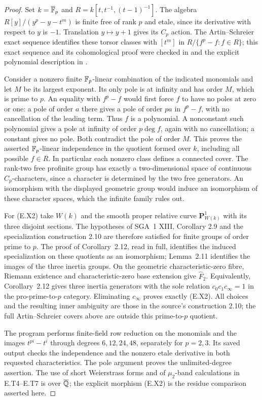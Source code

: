 \begin{proof}
Set $k=\overline{\mathbb F}_p$ and
$R=k[t,t^{-1},(t-1)^{-1}]$.
The algebra $R[y]/(y^p-y-t^m)$ is finite free of rank
$p$ and etale, since its derivative with respect to
$y$ is $-1$.  Translation $y\mapsto y+1$ gives its
$C_p$ action.  The Artin--Schreier exact sequence
identifies these torsor classes with $[t^m]$ in
$R/\{f^p-f:f\in R\}$; this exact sequence and its
cohomological proof were checked in
\cite[Tag 0A3J]{StacksArtinSchreier} and the explicit
polynomial description in
\cite[XIII, p.~292]{SGA1Revised}.

Consider a nonzero finite $\mathbb F_p$-linear combination of
the indicated monomials and let $M$ be its largest
exponent.  Its only pole is at infinity and has order
$M$, which is prime to $p$.  An equality with $f^p-f$
would first force $f$ to have no poles at zero or one:
a pole of order $a$ there gives a pole of order $pa$
in $f^p-f$, with no cancellation of the leading term.
Thus $f$ is a polynomial.  A nonconstant such polynomial
gives a pole at infinity of order $p\deg f$, again
with no cancellation; a constant gives no pole.
Both contradict the pole of order $M$.  This proves
the asserted $\mathbb F_p$-linear independence in the quotient
formed over $k$, including all possible $f\in R$.
In particular each nonzero class defines
a connected cover.  The rank-two free profinite group
has exactly a two-dimensional space of continuous
$C_p$-characters, since a character is determined by
the two free generators.  An isomorphism with the
displayed geometric group would induce an isomorphism
of these character spaces, which the infinite family
rules out.

For (E.X2) take $W(k)$ and the smooth proper relative
curve $\mathbf P^1_{W(k)}$ with its three disjoint
sections.  The hypotheses of SGA~1 XIII, Corollary
2.9 and the specialization construction 2.10 are
therefore satisfied for finite groups of order prime
to $p$.  The proof of Corollary~2.12, read in full,
identifies the induced specialization on these
quotients as an isomorphism; Lemma~2.11 identifies
the images of the three inertia groups.  On the
geometric characteristic-zero fibre, Riemann existence
and characteristic-zero base extension give
$\widehat F_2$.  Equivalently, Corollary~2.12 gives
three inertia generators with the sole relation
$c_0c_1c_\infty=1$ in the pro-prime-to-$p$ category.
Eliminating $c_\infty$ proves exactly (E.X2).
All choices and the resulting inner ambiguity are
those in the source's construction 2.10; the full
Artin--Schreier covers above are outside this
prime-to-$p$ quotient.

The program  performs
finite-field row reduction on the monomials and the
images $t^{pi}-t^i$ through degrees $6,12,24,48$,
separately for $p=2,3$.  Its saved output checks the
independence and the nonzero etale derivative in
both requested characteristics.  The pole argument
proves the unlimited-degree assertion.  The use of
short Weierstrass forms and of $\mu_2$-band
calculations in E.T4--E.T7 is over $\overline{\mathbb Q}$;
the explicit morphism (E.X2) is the residue comparison
asserted here.
\end{proof}

